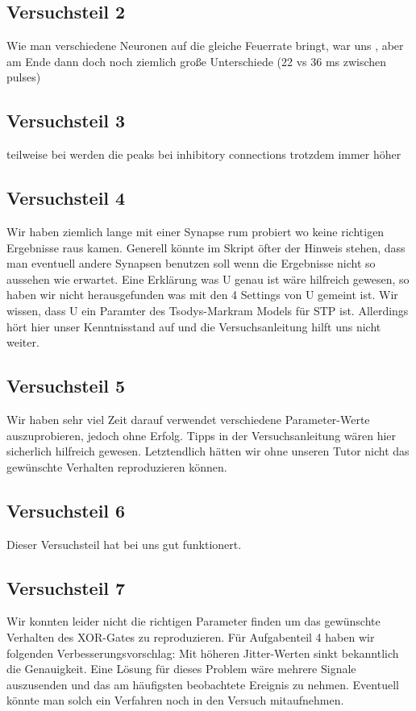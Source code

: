 \documentclass[10pt,a4paper]{scrartcl}
\begin{document}
\subsection*{Versuchsteil 2}
Wie man verschiedene Neuronen auf die gleiche Feuerrate bringt, war uns , aber am Ende dann doch noch ziemlich große Unterschiede (22 vs 36 ms zwischen pulses)

\subsection*{Versuchsteil 3}
teilweise bei werden die peaks bei inhibitory connections trotzdem immer höher

\subsection*{Versuchsteil 4}
Wir haben ziemlich lange mit einer Synapse rum probiert wo keine richtigen Ergebnisse raus kamen. Generell könnte im Skript öfter der Hinweis stehen, dass man eventuell andere Synapsen benutzen soll wenn die Ergebnisse nicht so aussehen wie erwartet. Eine Erklärung was U genau ist wäre hilfreich gewesen, so haben wir nicht herausgefunden was mit den 4 Settings von U gemeint ist. Wir wissen, dass U ein Paramter des Tsodys-Markram Models für STP ist. Allerdings hört hier unser Kenntnisstand auf und die Versuchsanleitung hilft uns nicht weiter.

\subsection*{Versuchsteil 5}
Wir haben sehr viel Zeit darauf verwendet verschiedene Parameter-Werte auszuprobieren, jedoch ohne Erfolg. Tipps in der Versuchsanleitung wären hier sicherlich hilfreich gewesen. Letztendlich hätten wir ohne unseren Tutor nicht das gewünschte Verhalten reproduzieren können.

\subsection*{Versuchsteil 6}
Dieser Versuchsteil hat bei uns gut funktionert.

\subsection*{Versuchsteil 7}
Wir konnten leider nicht die richtigen Parameter finden um das gewünschte Verhalten des XOR-Gates zu reproduzieren. Für Aufgabenteil 4 haben wir folgenden Verbesserungsvorschlag: Mit höheren Jitter-Werten sinkt bekanntlich die Genauigkeit. Eine Lösung für dieses Problem wäre mehrere Signale auszusenden und das am häufigsten beobachtete Ereignis zu nehmen. Eventuell könnte man solch ein Verfahren noch in den Versuch mitaufnehmen.
\end{document}
